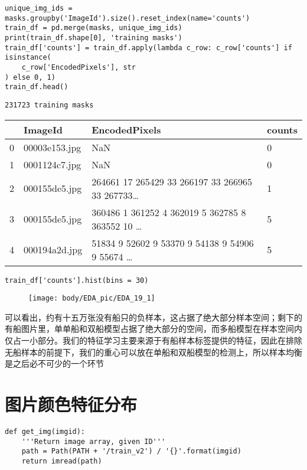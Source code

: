 \begin{lstlisting}
unique_img_ids = masks.groupby('ImageId').size().reset_index(name='counts')
train_df = pd.merge(masks, unique_img_ids)
print(train_df.shape[0], 'training masks')
train_df['counts'] = train_df.apply(lambda c_row: c_row['counts'] if isinstance(
    c_row['EncodedPixels'], str
) else 0, 1)
train_df.head()
\end{lstlisting}

\begin{lstlisting}
231723 training masks
\end{lstlisting}

\begin{longtable}[]{@{}llll@{}}
\toprule
& ImageId & EncodedPixels & counts\tabularnewline
\midrule
\endhead
0 & 00003e153.jpg & NaN & 0\tabularnewline
1 & 0001124c7.jpg & NaN & 0\tabularnewline
2 & 000155de5.jpg & 264661 17 265429 33 266197 33 266965 33
267733\ldots{} & 1\tabularnewline
3 & 000155de5.jpg & 360486 1 361252 4 362019 5 362785 8 363552 10
\ldots{} & 5\tabularnewline
4 & 000194a2d.jpg & 51834 9 52602 9 53370 9 54138 9 54906 9 55674
\ldots{} & 5\tabularnewline
\bottomrule
\end{longtable}

\begin{lstlisting}
train_df['counts'].hist(bins = 30)
\end{lstlisting}

\begin{figure}[htbp]
\centering
\texttt{[image: body/EDA\_pic/EDA\_19\_1]}
\caption{}
\end{figure}

可以看出，约有十五万张没有船只的负样本，这占据了绝大部分样本空间；剩下的有船图片里，单单船和双船模型占据了绝大部分的空间，而多船模型在样本空间内仅占一小部分。我们的特征学习主要来源于有船样本标签提供的特征，因此在排除无船样本的前提下，我们的重心可以放在单船和双船模型的检测上，所以样本均衡是之后必不可少的一个环节

\section{图片颜色特征分布}\label{ux56feux7247ux989cux8272ux7279ux5f81ux5206ux5e03}

\begin{lstlisting}
def get_img(imgid):
    '''Return image array, given ID'''
    path = Path(PATH + '/train_v2') / '{}'.format(imgid)
    return imread(path)
\end{lstlisting}

